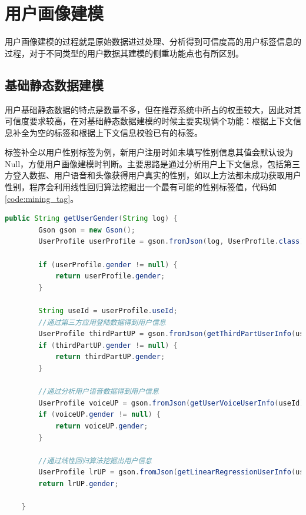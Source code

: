   \section{用户画像建模}
  用户画像建模的过程就是原始数据进过处理、分析得到可信度高的用户标签信息的过程，对于不同类型的用户数据其建模的侧重功能点也有所区别。
  \subsection{基础静态数据建模}
  用户基础静态数据的特点是数量不多，但在推荐系统中所占的权重较大，因此对其可信度要求较高，在对基础静态数据建模的时候主要实现俩个功能：根据上下文信息补全为空的标签和根据上下文信息校验已有的标签。

  标签补全以用户性别标签为例，新用户注册时如未填写性别信息其值会默认设为Null，方便用户画像建模时判断。主要思路是通过分析用户上下文信息，包括第三方登入数据、用户语音和头像获得用户真实的性别，如以上方法都未成功获取用户性别，程序会利用线性回归算法挖掘出一个最有可能的性别标签值，代码如\autoref{code:mining_tag}。
  \begin{lstlisting}[language=java,firstnumber=1,label={code:mining_tag}]
    public String getUserGender(String log) {
        Gson gson = new Gson();
        UserProfile userProfile = gson.fromJson(log, UserProfile.class);

        if (userProfile.gender != null) {
            return userProfile.gender;
        }

        String useId = userProfile.useId;
        //通过第三方应用登陆数据得到用户信息
        UserProfile thirdPartUP = gson.fromJson(getThirdPartUserInfo(useId), UserProfile.class);
        if (thirdPartUP.gender != null) {
            return thirdPartUP.gender;
        }

        //通过分析用户语音数据得到用户信息
        UserProfile voiceUP = gson.fromJson(getUserVoiceUserInfo(useId), UserProfile.class);
        if (voiceUP.gender != null) {
            return voiceUP.gender;
        }

        //通过线性回归算法挖掘出用户信息
        UserProfile lrUP = gson.fromJson(getLinearRegressionUserInfo(useId), UserProfile.class);
        return lrUP.gender;

    }
  \end{lstlisting}

